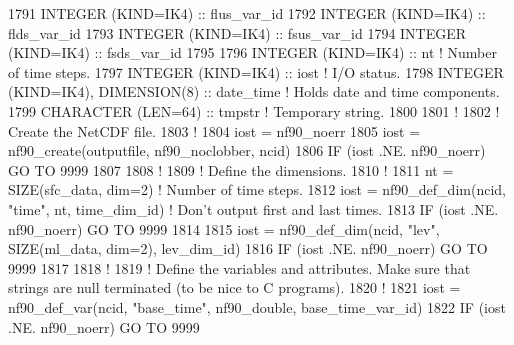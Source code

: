 \begin{DoxyCode}
1791     \textcolor{keywordtype}{INTEGER (KIND=IK4)}                  :: flus\_var\_id
1792     \textcolor{keywordtype}{INTEGER (KIND=IK4)}                  :: flds\_var\_id
1793     \textcolor{keywordtype}{INTEGER (KIND=IK4)}                  :: fsus\_var\_id
1794     \textcolor{keywordtype}{INTEGER (KIND=IK4)}                  :: fsds\_var\_id
1795 
1796     \textcolor{keywordtype}{INTEGER (KIND=IK4)}                  :: nt                                                   \textcolor{comment}{! Number of
       time steps.}
1797     \textcolor{keywordtype}{INTEGER (KIND=IK4)}                  :: iost                                                 \textcolor{comment}{! I/O
       status.}
1798     \textcolor{keywordtype}{INTEGER (KIND=IK4)}, \textcolor{keywordtype}{DIMENSION(8)}    :: date\_time                                            \textcolor{comment}{! Holds
       date and time components.}
1799     \textcolor{keywordtype}{CHARACTER (LEN=64)}                  :: tmpstr                                               \textcolor{comment}{! Temporary
       string.}
1800 
1801     \textcolor{comment}{!}
1802     \textcolor{comment}{! Create the NetCDF file.}
1803     \textcolor{comment}{!}
1804     iost    = nf90\_noerr
1805     iost    = nf90\_create(outputfile, nf90\_noclobber, ncid)
1806     \textcolor{keywordflow}{IF} (iost .NE. nf90\_noerr) \textcolor{keywordflow}{GO TO} 9999
1807 
1808     \textcolor{comment}{!}
1809     \textcolor{comment}{! Define the dimensions.}
1810     \textcolor{comment}{!}
1811     nt      = \textcolor{keyword}{SIZE}(sfc\_data, dim=2)                                                             \textcolor{comment}{! Number of
       time steps.}
1812     iost    = nf90\_def\_dim(ncid, \textcolor{stringliteral}{"time"}, nt, time\_dim\_id)                                     \textcolor{comment}{! Don't
       output first and last times.}
1813     \textcolor{keywordflow}{IF} (iost .NE. nf90\_noerr) \textcolor{keywordflow}{GO TO} 9999
1814 
1815     iost    = nf90\_def\_dim(ncid, \textcolor{stringliteral}{"lev"}, \textcolor{keyword}{SIZE}(ml\_data, dim=2), lev\_dim\_id)
1816     \textcolor{keywordflow}{IF} (iost .NE. nf90\_noerr) \textcolor{keywordflow}{GO TO} 9999
1817 
1818     \textcolor{comment}{!}
1819     \textcolor{comment}{! Define the variables and attributes. Make sure that strings are null terminated (to be nice to C
       programs).}
1820     \textcolor{comment}{!}
1821     iost    = nf90\_def\_var(ncid, \textcolor{stringliteral}{"base\_time"}, nf90\_double, base\_time\_var\_id)
1822     \textcolor{keywordflow}{IF} (iost .NE. nf90\_noerr) \textcolor{keywordflow}{GO TO} 9999

\end{DoxyCode}
